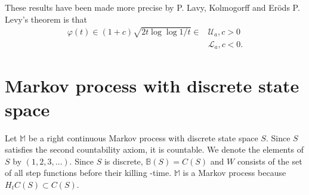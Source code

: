 These results have been made more precise by P. Lavy, Kolmogorff and
Er\"ods P. Levy's theorem is that 
\begin{align*}
\varphi (t) \in (1+c) \sqrt{2t\log\log 1/t}\in
& \mathscr{U}_a, c > 0\\
& \mathscr{L}_a, c < 0. 
\end{align*}

\section{Markov process with discrete state space}\label{chap2-sec8}

Let $\mathbb{M}$ be a right continuous Markov process with discrete
state space $S$. Since $S$ satisfies the second countability axiom, it
is countable. We denote the elements of $S$ by $(1,2,3,\ldots)$. Since
$S$ is discrete, $\mathbb{B} (S) = C (S)$ and $W$ consists of the set
of all step functions before their killing -time. $\mathbb{M}$ is a
Markov process because $H_t C (S) \subset C (S)$.   

